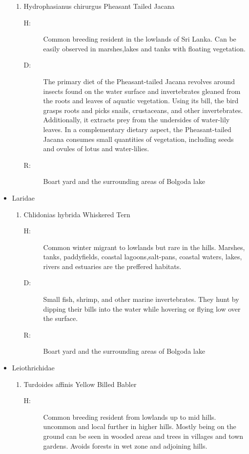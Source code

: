 \begin{itemize}
\begin{enumerate}
\item%
Hydrophasianus chirurgus\newline%
Pheasant Tailed Jacana%
\begin{description}%
\item[H: ]%
Common breeding resident in the lowlands of Sri Lanka. Can be easily observed in marshes,lakes and tanks with floating vegetation.%
\item[D: ]%
The primary diet of the Pheasant{-}tailed Jacana revolves around insects found on the water surface and invertebrates gleaned from the roots and leaves of aquatic vegetation. Using its bill, the bird grasps roots and picks snails, crustaceans, and other invertebrates. Additionally, it extracts prey from the undersides of water{-}lily leaves. In a complementary dietary aspect, the Pheasant{-}tailed Jacana consumes small quantities of vegetation, including seeds and ovules of lotus and water{-}lilies.%
\item[R: ]%
Boart yard and the surrounding areas of Bolgoda lake%
\end{description}%
\end{enumerate}%
\item%
Laridae%
\begin{enumerate}%
\item%
Chlidonias hybrida\newline%
Whiskered Tern%
\begin{description}%
\item[H: ]%
Common winter migrant to lowlands but rare in the hills. Marshes, tanks, paddyfields, coastal lagoons,salt{-}pans, coastal waters, lakes, rivers and estuaries are the preffered habitats.%
\item[D: ]%
 Small fish, shrimp, and other marine invertebrates. They hunt by dipping their bills into the water while hovering or flying low over the surface.%
\item[R: ]%
Boart yard and the surrounding areas of Bolgoda lake%
\end{description}%
\end{enumerate}%
\item%
Leiothrichidae%
\begin{enumerate}%
\item%
Turdoides affinis\newline%
Yellow Billed Babler%
\begin{description}%
\item[H: ]%
Common breeding resident from lowlands up to mid hills. uncommon and local further in higher hills. Mostly being on the ground can be seen in wooded areas and trees in villages and town gardens. Avoids forests in wet zone and adjoining hills. %

\end{description}
\end{enumerate}
\end{itemize}
